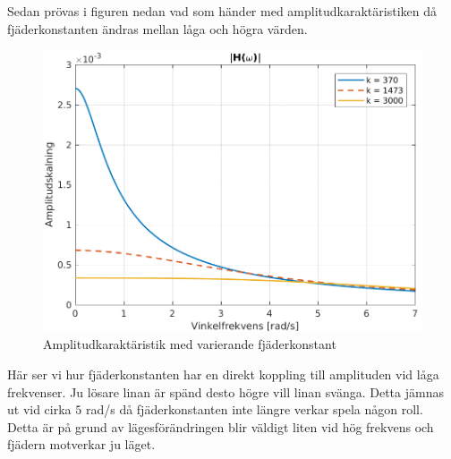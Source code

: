 \newpage
Sedan prövas i figuren nedan vad som händer med amplitudkaraktäristiken då fjäderkonstanten ändras mellan låga och högra värden. 
\begin{figure}[H]
    \centering
    \includegraphics[scale=0.9]{bilder/amplitudkaraktaristik_variation_k}
    \caption{Amplitudkaraktäristik med varierande fjäderkonstant}
    \label{fig:amplitudkaraktaristik_variation_k}
\end{figure}
Här ser vi hur fjäderkonstanten har en direkt koppling till amplituden vid låga frekvenser. Ju lösare linan är spänd desto högre vill linan svänga. Detta jämnas ut vid cirka  $5$ rad/s då fjäderkonstanten inte längre verkar spela någon roll. Detta är på grund av lägesförändringen blir väldigt liten vid hög frekvens och fjädern motverkar ju läget.

